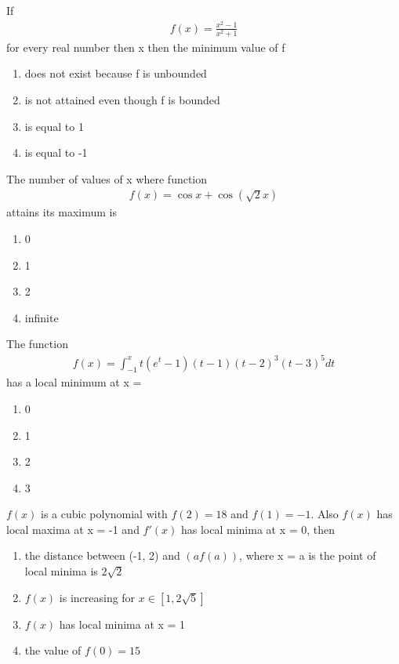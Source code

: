 \item If 
\begin{align*}
f(x) = \frac{x^2 - 1}{x^2 + 1}
\end{align*}
for every real number then x then the minimum value of f
\begin{enumerate}
\item does not exist because f is unbounded 
\item is not attained even though f is bounded 
\item is equal to 1
\item is equal to -1
\end{enumerate}

\item The number of values of x where function 
\begin{align*}
f(x) = \cos x + \cos(\sqrt{2}x)    
\end{align*}
attains its maximum is 
\begin{enumerate}
\item 0
\item 1
\item 2
\item infinite
\end{enumerate}

\item The function 
\begin{align*}
f(x) = \int_{-1}^{x} t(e^t - 1)(t - 1)(t - 2)^{3}(t - 3)^{5}dt
\end{align*}
has a local minimum at x =
\begin{enumerate}
\item 0
\item 1
\item 2
\item 3
\end{enumerate}

\item $f(x)$ is a cubic polynomial with $f(2) = 18$ and $f(1) = -1$. Also $f(x)$ has local maxima at x = -1 and $f'(x)$ has local minima at x = 0, then
\begin{enumerate}
\item the distance between (-1, 2) and $(af(a))$, where x = a is the point of local minima is $2\sqrt{2}$
\item $f(x)$ is increasing for $x \in [1, 2\sqrt{5}]$
\item $f(x)$ has local minima at x = 1
\item the value of $f(0) = 15$
\end{enumerate}

